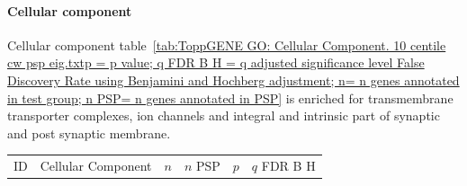 \paragraph{Cellular component}

Cellular component table~\ref{tab:ToppGENE GO: Cellular Component. 10 centile cw psp eig.txtp = p value; q FDR B H = q adjusted significance level False Discovery Rate using Benjamini and Hochberg adjustment; n= n genes annotated in test group; n PSP= n genes annotated in PSP} is enriched for transmembrane transporter complexes, ion channels and integral and intrinsic part of synaptic and post synaptic membrane. 
 \begin{table}[ht]
\centering
\begin{adjustbox}{width=\textwidth}
\setlength{\extrarowheight}{2pt}
\begin{tabular}{@{}clllcl@{}}
  \toprule
  ID & Cellular Component & $n$ & $n$ PSP & $p$ & $q$ FDR B H \\ 


\end{tabular}
\end{adjustbox}
\end{table}
